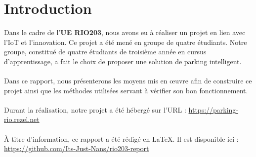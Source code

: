 \section*{Introduction}

\paragraph*{}
Dans le cadre de l'\textbf{UE RIO203}, nous avons eu à réaliser un projet en lien avec l'IoT et l'innovation. Ce projet a été mené en groupe de quatre étudiants. Notre groupe, constitué de quatre étudiants de troisième année en cursus d'apprentissage, a fait le choix de proposer une solution de parking intelligent.

\paragraph*{}
Dans ce rapport, nous présenterons les moyens mis en \oe{}uvre afin de construire ce projet ainsi que les méthodes utilisées servant à vérifier son bon fonctionnement.

\paragraph*{}
Durant la réalisation, notre projet a été hébergé sur l'URL : \url{https://parking-rio.rezel.net}

\paragraph*{}
À titre d'information, ce rapport a été rédigé en \LaTeX. Il est disponible ici : \url{https://github.com/Its-Just-Nans/rio203-report}